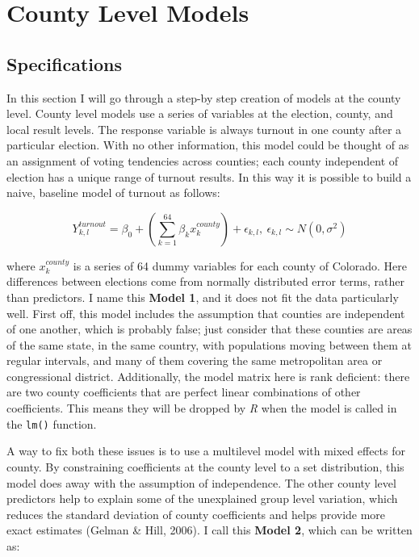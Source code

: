 \documentclass[12pt,twoside]{reedthesis}
\begin{document}
  \section{County Level Models}\label{county-level-models}
  
  \subsection{Specifications}\label{specifications}
  
  In this section I will go through a step-by step creation of models at
  the county level. County level models use a series of variables at the
  election, county, and local result levels. The response variable is
  always turnout in one county after a particular election. With no other
  information, this model could be thought of as an assignment of voting
  tendencies across counties; each county independent of election has a
  unique range of turnout results. In this way it is possible to build a
  naive, baseline model of turnout as follows:
  
  \begin{equation} \tag{Model 1}
  Y^{turnout}_{k,l} = \beta_0 + (\sum_{k=1}^{64}\beta_kx_k^{county}) + \epsilon_{k,l},\ \epsilon_{k,l} \sim N(0,\sigma^2)
  \end{equation}
  
  where \(x_k^{county}\) is a series of 64 dummy variables for each county
  of Colorado. Here differences between elections come from normally
  distributed error terms, rather than predictors. I name this
  \textbf{Model 1}, and it does not fit the data particularly well. First
  off, this model includes the assumption that counties are independent of
  one another, which is probably false; just consider that these counties
  are areas of the same state, in the same country, with populations
  moving between them at regular intervals, and many of them covering the
  same metropolitan area or congressional district. Additionally, the
  model matrix here is rank deficient: there are two county coefficients
  that are perfect linear combinations of other coefficients. This means
  they will be dropped by \textit{R} when the model is called in the
  \texttt{lm()} function.
  
  A way to fix both these issues is to use a multilevel model with mixed
  effects for county. By constraining coefficients at the county level to
  a set distribution, this model does away with the assumption of
  independence. The other county level predictors help to explain some of
  the unexplained group level variation, which reduces the standard
  deviation of county coefficients and helps provide more exact estimates
  (Gelman \& Hill, 2006). I call this \textbf{Model 2}, which can be
  written as:
  
\end{document}
